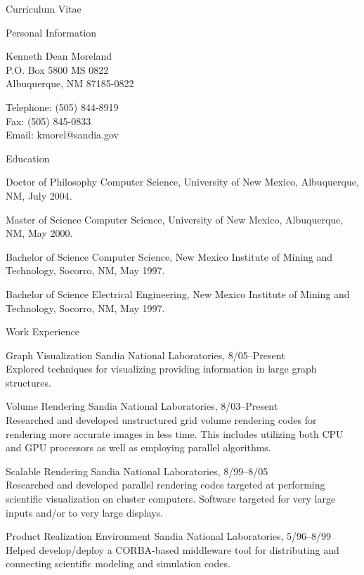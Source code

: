 \documentclass{article}
\date{February  5, 2007}
\begin{document}
  \begin{cv}{Curriculum Vitae}

    \begin{cvlist}{Personal Information}
      \item Kenneth Dean Moreland \\
	P.O. Box 5800  MS 0822 \\
	Albuquerque, NM  87185-0822
      \item Telephone: (505) 844-8919 \\
	Fax: (505) 845-0833 \\
	Email: kmorel@sandia.gov
    \end{cvlist}

    \begin{cvlist}{Education}
      \item[Doctor of Philosophy] Computer Science, University of New
        Mexico, Albuquerque, NM, July 2004.
      \item[Master of Science] Computer Science, University of New Mexico,
	Albuquerque, NM, May 2000.
      \item[Bachelor of Science] Computer Science, New Mexico Institute of
	Mining and Technology, Socorro, NM, May 1997.
      \item[Bachelor of Science] Electrical Engineering, New Mexico
	Institute of Mining and Technology, Socorro, NM, May 1997.
    \end{cvlist}

    \begin{cvlist}{Work Experience}
    \item[Graph Visualization] Sandia National Laboratories, 8/05--Present \\
      Explored techniques for visualizing providing information in large
      graph structures.
    \item[Volume Rendering] Sandia National Laboratories, 8/03--Present \\
      Researched and developed unstructured grid volume rendering codes for
      rendering more accurate images in less time.  This includes utilizing
      both CPU and GPU processors as well as employing parallel algorithms.
    \item[Scalable Rendering] Sandia National Laboratories, 8/99--8/05 \\
      Researched and developed parallel rendering codes targeted at
      performing scientific visualization on cluster computers.  Software
      targeted for very large inputs and/or to very large displays.
    \item[Product Realization Environment] Sandia National Laboratories,
      5/96--8/99 \\
      Helped develop/deploy a CORBA-based middleware tool for distributing
      and connecting scientific modeling and simulation codes.
    \end{cvlist}


\end{cv}
\end{document}
